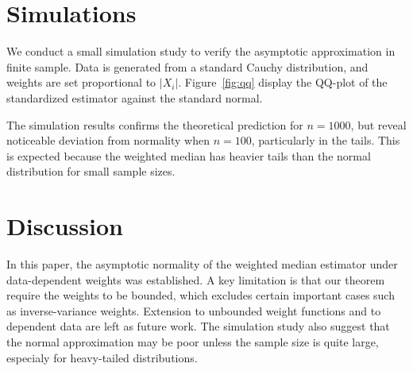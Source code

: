 \documentclass[12pt]{article}
\begin{document}
\section{Simulations}

We conduct a small simulation study to verify the asymptotic approximation in finite sample. Data is generated from a standard Cauchy distribution, and weights are set proportional to $|X_i|$. Figure~\ref{fig:qq} display the QQ-plot of the standardized estimator against the standard normal.

The simulation results confirms the theoretical prediction for $n = 1000$, but reveal noticeable deviation from normality when $n = 100$, particularly in the tails. This is expected because the weighted median has heavier tails than the normal distribution for small sample sizes.

\section{Discussion}

In this paper, the asymptotic normality of the weighted median estimator under data-dependent weights was established. A key limitation is that our theorem require the weights to be bounded, which excludes certain important cases such as inverse-variance weights. Extension to unbounded weight functions and to dependent data are left as future work. The simulation study also suggest that the normal approximation may be poor unless the sample size is quite large, especialy for heavy-tailed distributions.
\end{document}
